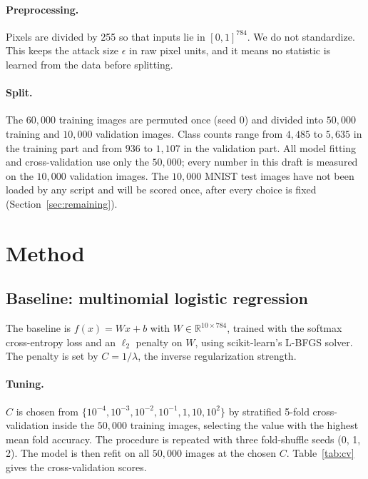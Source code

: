 \documentclass{article}
\begin{document}
\paragraph{Preprocessing.} Pixels are divided by 255 so that inputs lie in $[0,1]^{784}$. We do not standardize. This keeps the attack size $\epsilon$ in raw pixel units, and it means no statistic is learned from the data before splitting.

\paragraph{Split.} The $60{,}000$ training images are permuted once (seed 0) and divided into $50{,}000$ training and $10{,}000$ validation images. Class counts range from $4{,}485$ to $5{,}635$ in the training part and from $936$ to $1{,}107$ in the validation part. All model fitting and cross-validation use only the $50{,}000$; every number in this draft is measured on the $10{,}000$ validation images. The $10{,}000$ MNIST test images have not been loaded by any script and will be scored once, after every choice is fixed (Section~\ref{sec:remaining}).

\section{Method}
\label{sec:method}

\subsection{Baseline: multinomial logistic regression}

The baseline is $f(x) = Wx + b$ with $W \in \mathbb{R}^{10 \times 784}$, trained with the softmax cross-entropy loss and an $\ell_2$ penalty on $W$, using scikit-learn's L-BFGS solver. The penalty is set by $C = 1/\lambda$, the inverse regularization strength.

\paragraph{Tuning.} $C$ is chosen from $\{10^{-4}, 10^{-3}, 10^{-2}, 10^{-1}, 1, 10, 10^{2}\}$ by stratified 5-fold cross-validation inside the $50{,}000$ training images, selecting the value with the highest mean fold accuracy. The procedure is repeated with three fold-shuffle seeds (0, 1, 2). The model is then refit on all $50{,}000$ images at the chosen $C$. Table~\ref{tab:cv} gives the cross-validation scores.
\end{document}
